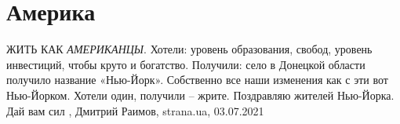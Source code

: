  
 
 
 
 
\chapter{Америка}
\label{sec:slova.amerika}

ЖИТЬ КАК \emph{АМЕРИКАНЦЫ}. Хотели: уровень образования, свобод, уровень
инвестиций, чтобы круто и богатство.  Получили: село в Донецкой области
получило название «Нью-Йорк».  Собственно все наши изменения как с эти вот
Нью-Йорком. Хотели один, получили – жрите.  Поздравляю жителей Нью-Йорка. Дай
вам сил
,
Дмитрий Раимов, strana.ua, 03.07.2021

